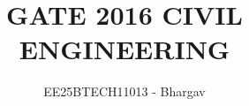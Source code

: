 \documentclass[journal]{IEEEtran}
\begin{document}


\title{GATE 2016 CIVIL ENGINEERING}
\author{EE25BTECH11013 - Bhargav}
\maketitle
{\let\newpage\relax\maketitle}

\renewcommand{\thefigure}{\theenumi}
\renewcommand{\thetable}{\theenumi}
\setlength{\intextsep}{10pt} %
\end{document}
